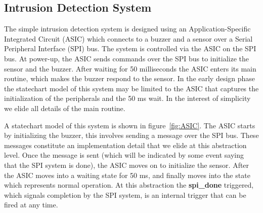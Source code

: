 

\subsection{Intrusion Detection System}
\label{sec:secbot}


The simple intrusion detection system is designed using an Application-Specific Integrated Circuit (ASIC) which connects to a buzzer and a sensor over a Serial Peripheral Interface (SPI) bus. The system is controlled via the ASIC on the SPI bus. At power-up, the ASIC sends commands over the SPI bus to initialize the sensor and the buzzer. After waiting for 50 milliseconds the ASIC enters its main routine, which makes the buzzer respond to the sensor. In the early design phase the statechart model of this system may be limited to the ASIC that captures the initialization of the peripherals and the 50 ms wait. In the interest of simplicity we elide all details of the main routine.

A statechart model of this system is shown in figure~\ref{fig:ASIC}. The ASIC starts by initializing the buzzer, this involves sending a message over the SPI bus. These messages constitute an implementation detail that we elide at this abstraction level. Once the message is sent (which will be indicated by some event saying that the SPI system is done), the ASIC moves on to initialize the sensor. After the ASIC moves into a waiting state for 50 ms, and finally moves into the state which represents normal operation. At this abstraction the \textbf{spi\_done} triggered, which signals completion by the SPI system, is an internal trigger that can be fired at any time.


